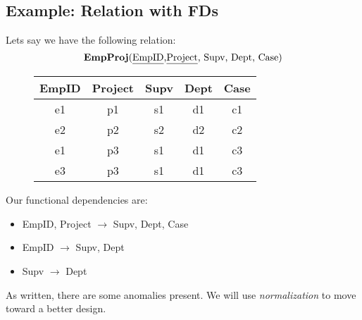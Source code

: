 \documentclass{report}
\begin{document}
\subsection*{Example: Relation with FDs}
Lets say we have the following relation:
$$ \text{\textbf{EmpProj}(\underline{EmpID},\underline{Project}, Supv, Dept, Case)} $$
    \begin{figure}[ht]
    \centering
    \setlength{\tabcolsep}{30}
    \begin{tabular}{c c c c c}
    \hline 
    EmpID & Project & Supv & Dept & Case \\
    \hline
    e1 & p1 & s1 & d1 & c1 \\
    \hline
    e2 & p2 & s2 & d2 & c2 \\
    \hline
    e1 & p3 & s1 & d1 & c3 \\
    \hline
    e3 & p3 & s1 & d1 & c3 \\
    \hline
    \end{tabular}
    \end{figure}
    \bigbreak \noindent
Our functional dependencies are:
\begin{itemize}
    \item EmpID, Project $\rightarrow$ Supv, Dept, Case
    \item  EmpID $\rightarrow$ Supv, Dept
    \item Supv $\rightarrow$ Dept
\end{itemize}
As written, there are some anomalies present. We will use \textit{normalization} to move toward a better design.
\end{document}
